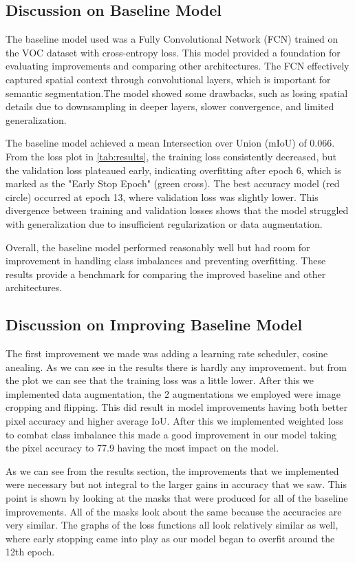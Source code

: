 \documentclass{article}
\begin{document}
\subsection{Discussion on Baseline Model}

The baseline model used was a Fully Convolutional Network (FCN) trained on the VOC dataset with cross-entropy loss. This model provided a foundation for evaluating improvements and comparing other architectures. The FCN effectively captured spatial context through convolutional layers, which is important for semantic segmentation.The model showed some drawbacks, such as losing spatial details due to downsampling in deeper layers, slower convergence, and limited generalization.

The baseline model achieved a mean Intersection over Union (mIoU) of $0.066$. From the loss plot in \ref{tab:results}, the training loss consistently decreased, but the validation loss plateaued early, indicating overfitting after epoch 6, which is marked as the "Early Stop Epoch" (green cross). The best accuracy model (red circle) occurred at epoch 13, where validation loss was slightly lower. This divergence between training and validation losses shows that the model struggled with generalization due to insufficient regularization or data augmentation.

Overall, the baseline model performed reasonably well but had room for improvement in handling class imbalances and preventing overfitting. These results provide a benchmark for comparing the improved baseline and other architectures.


\subsection{Discussion on Improving Baseline Model}

The first improvement we made was adding a learning rate scheduler, cosine anealing. As we can see in the results there is hardly any improvement. but from the plot we can see that the training loss was a little lower. After this we implemented data augmentation, the 2 augmentations we employed were image cropping and flipping. This did result in model improvements having both better pixel accuracy and higher average IoU.  After this we implemented weighted loss to combat class imbalance this made a good improvement in our model taking the pixel accuracy to 77.9 having the most impact on the model. 

As we can see from the results section, the improvements that we implemented were necessary but not integral to the larger gains in accuracy that we saw. This point is shown by looking at the masks that were produced for all of the baseline improvements. All of the masks look about the same because the accuracies are very similar. The graphs of the loss functions all look relatively similar as well, where early stopping came into play as our model began to overfit around the 12th epoch.
\end{document}
